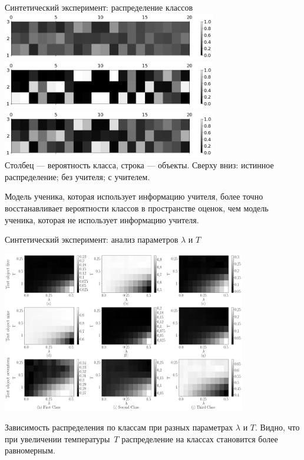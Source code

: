 \documentclass[10pt,pdf,hyperref={unicode}]{beamer}
\begin{document}
\begin{frame}{Синтетический эксперимент: распределение классов}
\justifying
{\center
\includegraphics[width=0.7\textwidth]{figures/syn_real_distr}\\
\includegraphics[width=0.7\textwidth]{figures/syn_without_teacher_distr}\\
\includegraphics[width=0.7\textwidth]{figures/syn_with_teacher_distr}\\
}
Столбец --- вероятность класса, строка --- объекты.
Сверху вниз: истинное распределение; без учителя; с учителем.

Модель ученика, которая использует информацию учителя, более точно восстанавливает вероятности классов в пространстве оценок, чем модель ученика, которая не использует информацию учителя.
\end{frame}

\begin{frame}{Синтетический эксперимент: анализ параметров $\lambda$ и $T$}
\justifying
\begin{center}
{\center
\includegraphics[width=0.8\textwidth]{figures/syn_T_lambda}
}
\end{center}

Зависимость распределения по классам при разных параметрах $\lambda$ и $T$.  Видно, что при увеличении температуры~$T$ распределение на классах становится более равномерным.

\end{frame}
\end{document}
